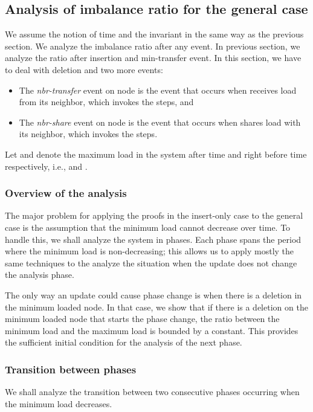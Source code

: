 \documentclass[a4paper]{article}
\begin{document}
\subsection{Analysis of imbalance ratio for the general case}

We assume the notion of time and the invariant in the same way as the
previous section. We analyze the imbalance ratio after any event.
In previous section, we analyze the ratio after insertion and
min-transfer event. In this section, we have to deal with deletion
and two more events:
\begin{itemize}
\item The \textit{nbr-transfer} event on node  is the event that
  occurs when  receives load from its neighbor, which invokes the
  {\splitmax} steps, and
\item The \textit{nbr-share} event on node  is the event that occurs
  when  shares load with its neighbor, which invokes the
  {\splitnbr} steps.
\end{itemize}

Let  and  denote the maximum load in the system after
time  and right before time  respectively, i.e.,  and .

\subsubsection{Overview of the analysis}
The major problem for applying the proofs in the insert-only case to
the general case is the assumption that the minimum load cannot
decrease over time.  To handle this, we shall analyze the system in
phases.  Each phase spans the period where the minimum load is non-decreasing;
this allows us to apply mostly the same techniques to the analyze the situation 
when the update does not change the analysis phase.

The only way an update could cause phase change is when there is a deletion
in the minimum loaded node.  In that case, we show that if there is a deletion 
on the minimum loaded node that starts the phase change, the ratio between 
the minimum load and the maximum load is bounded by a constant.  This provides
the sufficient initial condition for the analysis of the next phase.

\subsubsection{Transition between phases}

We shall analyze the transition between two consecutive phases
occurring when the minimum load decreases. 
\end{document}

